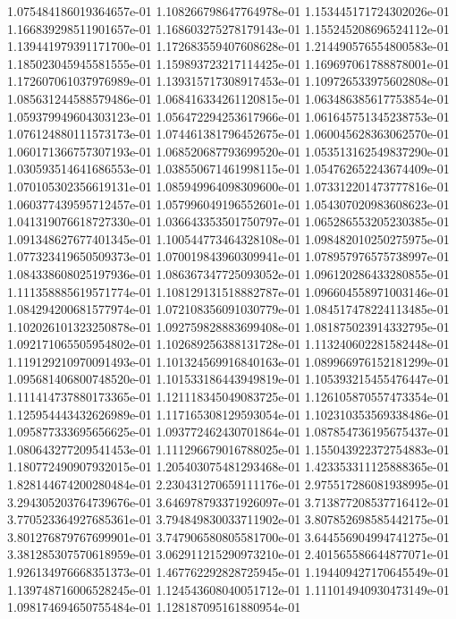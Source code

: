 1.075484186019364657e-01
1.108266798647764978e-01
1.153445171724302026e-01
1.166839298511901657e-01
1.168603275278179143e-01
1.155245208696524112e-01
1.139441979391171700e-01
1.172683559407608628e-01
1.214490576554800583e-01
1.185023045945581555e-01
1.159893723217114425e-01
1.169697061788878001e-01
1.172607061037976989e-01
1.139315717308917453e-01
1.109726533975602808e-01
1.085631244588579486e-01
1.068416334261120815e-01
1.063486385617753854e-01
1.059379949604303123e-01
1.056472294253617966e-01
1.061645751345238753e-01
1.076124880111573173e-01
1.074461381796452675e-01
1.060045628363062570e-01
1.060171366757307193e-01
1.068520687793699520e-01
1.053513162549837290e-01
1.030593514641686553e-01
1.038550671461998115e-01
1.054762652243674409e-01
1.070105302356619131e-01
1.085949964098309600e-01
1.073312201473777816e-01
1.060377439595712457e-01
1.057996049196552601e-01
1.054307020983608623e-01
1.041319076618727330e-01
1.036643353501750797e-01
1.065286553205230385e-01
1.091348627677401345e-01
1.100544773464328108e-01
1.098482010250275975e-01
1.077323419650509373e-01
1.070019843960309941e-01
1.078957976575738997e-01
1.084338608025197936e-01
1.086367347725093052e-01
1.096120286433280855e-01
1.111358885619571774e-01
1.108129131518882787e-01
1.096604558971003146e-01
1.084294200681577974e-01
1.072108356091030779e-01
1.084517478224113485e-01
1.102026101323250878e-01
1.092759828883699408e-01
1.081875023914332795e-01
1.092171065505954802e-01
1.102689256388131728e-01
1.113240602281582448e-01
1.119129210970091493e-01
1.101324569916840163e-01
1.089966976152181299e-01
1.095681406800748520e-01
1.101533186443949819e-01
1.105393215455476447e-01
1.111414737880173365e-01
1.121118345049083725e-01
1.126105870557473354e-01
1.125954443432626989e-01
1.117165308129593054e-01
1.102310353569338486e-01
1.095877333695656625e-01
1.093772462430701864e-01
1.087854736195675437e-01
1.080643277209541453e-01
1.111296679016788025e-01
1.155043922372754883e-01
1.180772490907932015e-01
1.205403075481293468e-01
1.423353311125888365e-01
1.828144674200280484e-01
2.230431270659111176e-01
2.975517286081938995e-01
3.294305203764739676e-01
3.646978793371926097e-01
3.713877208537716412e-01
3.770523364927685361e-01
3.794849830033711902e-01
3.807852698585442175e-01
3.801276879767699901e-01
3.747906580805581700e-01
3.644556904994741275e-01
3.381285307570618959e-01
3.062911215290973210e-01
2.401565586644877071e-01
1.926134976668351373e-01
1.467762292828725945e-01
1.194409427170645549e-01
1.139748716006528245e-01
1.124543608040051712e-01
1.111014940930473149e-01
1.098174694650755484e-01
1.128187095161880954e-01
